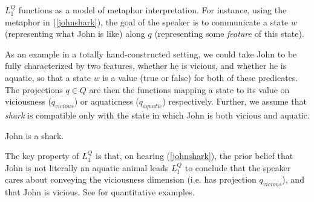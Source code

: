 \documentclass[9pt,twocolumn,twoside,lineno]{pnas-new}
\newcommand{\Listener}{L}
\newcommand{\QLONE}{\Listener_{{1}}^{{Q}}}
\begin{document}
	$\QLONE$ functions as a model of metaphor interpretation. For instance, using the metaphor in (\ref{johnshark}), the goal of the speaker is to communicate a state $w$ (representing what John is like) along $q$ (representing some \emph{feature} of this state).

	As an example in a totally hand-constructed setting, we could take John to be fully characterized by two features, whether he is vicious, and whether he is aquatic, so that a state $w$ is a value (true or false) for both of these predicates. The projections $q\in Q$ are then the functions mapping a state to its value on viciousness ($q_{vicious}$) or aquaticness ($q_{aquatic}$) respectively. Further, we assume that \emph{shark} is compatible only with the state in which John is both vicious and aquatic.



	\begin{examples}
	\item John is a shark. \label{johnshark}
	\end{examples}

	




		
	
	The key property of $\QLONE$ is that, on hearing (\ref{johnshark}), the prior belief that John is not literally an aquatic animal leads $\QLONE$ to conclude that the speaker cares about conveying the viciousness dimension (i.e. has projection $q_{vicious}$), and that John is vicious. See \cite{kao} for quantitative examples.
\end{document}

